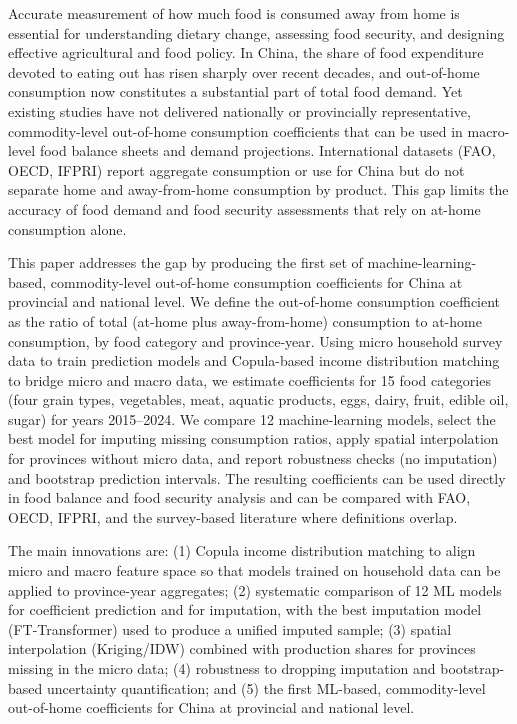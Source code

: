 \documentclass[12pt,a4paper]{article}
\begin{document}
Accurate measurement of how much food is consumed away from home is essential for understanding dietary change, assessing food security, and designing effective agricultural and food policy. In China, the share of food expenditure devoted to eating out has risen sharply over recent decades, and out-of-home consumption now constitutes a substantial part of total food demand. Yet existing studies have not delivered nationally or provincially representative, commodity-level out-of-home consumption coefficients that can be used in macro-level food balance sheets and demand projections. International datasets (FAO, OECD, IFPRI) report aggregate consumption or use for China but do not separate home and away-from-home consumption by product. This gap limits the accuracy of food demand and food security assessments that rely on at-home consumption alone.

This paper addresses the gap by producing the first set of machine-learning-based, commodity-level out-of-home consumption coefficients for China at provincial and national level. We define the out-of-home consumption coefficient as the ratio of total (at-home plus away-from-home) consumption to at-home consumption, by food category and province-year. Using micro household survey data to train prediction models and Copula-based income distribution matching to bridge micro and macro data, we estimate coefficients for 15 food categories (four grain types, vegetables, meat, aquatic products, eggs, dairy, fruit, edible oil, sugar) for years 2015--2024. We compare 12 machine-learning models, select the best model for imputing missing consumption ratios, apply spatial interpolation for provinces without micro data, and report robustness checks (no imputation) and bootstrap prediction intervals. The resulting coefficients can be used directly in food balance and food security analysis and can be compared with FAO, OECD, IFPRI, and the survey-based literature where definitions overlap.

The main innovations are: (1) Copula income distribution matching to align micro and macro feature space so that models trained on household data can be applied to province-year aggregates; (2) systematic comparison of 12 ML models for coefficient prediction and for imputation, with the best imputation model (FT-Transformer) used to produce a unified imputed sample; (3) spatial interpolation (Kriging/IDW) combined with production shares for provinces missing in the micro data; (4) robustness to dropping imputation and bootstrap-based uncertainty quantification; and (5) the first ML-based, commodity-level out-of-home coefficients for China at provincial and national level.
\end{document}
